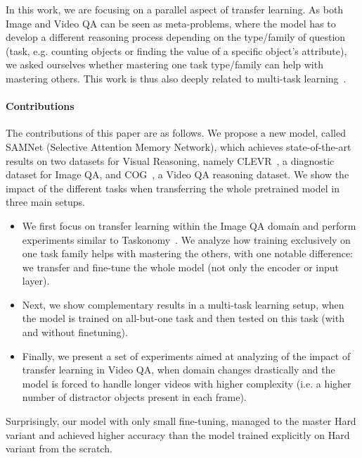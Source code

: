 In this work, we are focusing on a parallel aspect of transfer learning. As both Image and Video QA can be seen as meta-problems, where the model has to develop a different reasoning process depending on the type/family of question (task, e.g. counting objects or finding the value of a specific object's attribute), we asked ourselves whether mastering one task type/family can help with mastering others. This work is thus also deeply related to multi-task learning~\cite{caruana1997multitask}.

\paragraph{Contributions}

The contributions of this paper are as follows.
We propose a new model, called SAMNet (Selective Attention Memory Network), which achieves state-of-the-art results on two datasets for Visual Reasoning, namely CLEVR~\cite{johnson2017clevr}, a diagnostic dataset for Image QA, and COG~\cite{yang2018dataset}, a Video QA reasoning dataset.
We show the impact of the different tasks when transferring the whole pretrained model in three main setups.
\begin{itemize}
	\item We first focus on transfer learning within the Image QA domain and perform experiments similar to Taskonomy~\cite{zamir2018taskonomy}. We analyze how training exclusively on one task family helps with mastering the others, with one notable difference: we transfer and fine-tune the whole model (not only the encoder or input layer).
	\item Next, we show complementary results in a multi-task learning setup, when the model is trained on all-but-one task and then tested on this task (with and without finetuning).
	\item Finally, we present a set of experiments aimed at analyzing of the impact of transfer learning in Video QA, when domain changes drastically and the model is forced to handle longer videos with higher complexity (i.e. a higher number of distractor objects present in each frame).
\end{itemize}
Surprisingly, our model with only small fine-tuning, managed to the master Hard variant and achieved higher accuracy than the model trained explicitly on Hard variant from the scratch.


